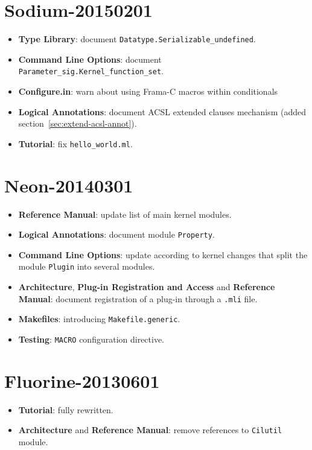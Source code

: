 \section*{Sodium-20150201}

\begin{itemize}
\item \textbf{Type Library}: document
  \texttt{Datatype.Serializable\_undefined}.
\item \textbf{Command Line Options}: document
  \texttt{Parameter\_sig.Kernel\_function\_set}.
\item \textbf{Configure.in}: warn about using Frama-C macros within conditionals
\item \textbf{Logical Annotations}: document ACSL extended clauses mechanism
  (added section~\ref{sec:extend-acsl-annot}).
\item \textbf{Tutorial}: fix \texttt{hello\_world.ml}.
\end{itemize}

\section*{Neon-20140301}

\begin{itemize}
\item \textbf{Reference Manual}: update list of main kernel modules.
\item \textbf{Logical Annotations}: document module \texttt{Property}.
\item \textbf{Command Line Options}: update according to kernel changes that
  split the module \texttt{Plugin} into several modules.
\item \textbf{Architecture}, \textbf{Plug-in Registration and Access} and
  \textbf{Reference Manual}: document registration of a plug-in through a
  \texttt{.mli} file.
\item \textbf{Makefiles}: introducing \texttt{Makefile.generic}.
\item \textbf{Testing}: \texttt{MACRO} configuration directive.
\end{itemize}

\section*{Fluorine-20130601}

\begin{itemize}
\item \textbf{Tutorial}: fully rewritten.
\item \textbf{Architecture} and \textbf{Reference Manual}: remove references
      to \texttt{Cilutil} module.
\end{itemize}


